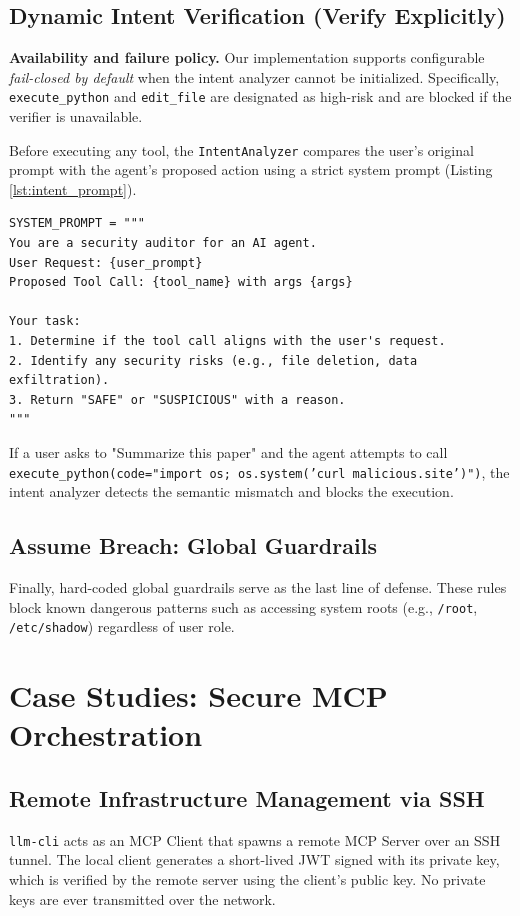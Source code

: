 \documentclass[conference]{IEEEtran}
\begin{document}
\subsection{Dynamic Intent Verification (Verify Explicitly)}
\textbf{Availability and failure policy.} Our implementation supports configurable \emph{fail-closed by default} when the intent analyzer cannot be initialized. Specifically, \texttt{execute\_python} and \texttt{edit\_file} are designated as high-risk and are blocked if the verifier is unavailable.

Before executing any tool, the \texttt{IntentAnalyzer} compares the user's original prompt with the agent's proposed action using a strict system prompt (Listing \ref{lst:intent_prompt}).

\begin{lstlisting}[caption={System Prompt for Intent Analyzer}, label={lst:intent_prompt}]
SYSTEM_PROMPT = """
You are a security auditor for an AI agent.
User Request: {user_prompt}
Proposed Tool Call: {tool_name} with args {args}

Your task:
1. Determine if the tool call aligns with the user's request.
2. Identify any security risks (e.g., file deletion, data exfiltration).
3. Return "SAFE" or "SUSPICIOUS" with a reason.
"""
\end{lstlisting}

If a user asks to "Summarize this paper" and the agent attempts to call \texttt{execute\_python(code="import os; os.system('curl malicious.site')")}, the intent analyzer detects the semantic mismatch and blocks the execution.

\subsection{Assume Breach: Global Guardrails}
Finally, hard-coded global guardrails serve as the last line of defense. These rules block known dangerous patterns such as accessing system roots (e.g., \texttt{/root}, \texttt{/etc/shadow}) regardless of user role.

\section{Case Studies: Secure MCP Orchestration}

\subsection{Remote Infrastructure Management via SSH}
\texttt{llm-cli} acts as an MCP Client that spawns a remote MCP Server over an SSH tunnel. The local client generates a short-lived JWT signed with its private key, which is verified by the remote server using the client's public key. No private keys are ever transmitted over the network.
\end{document}
